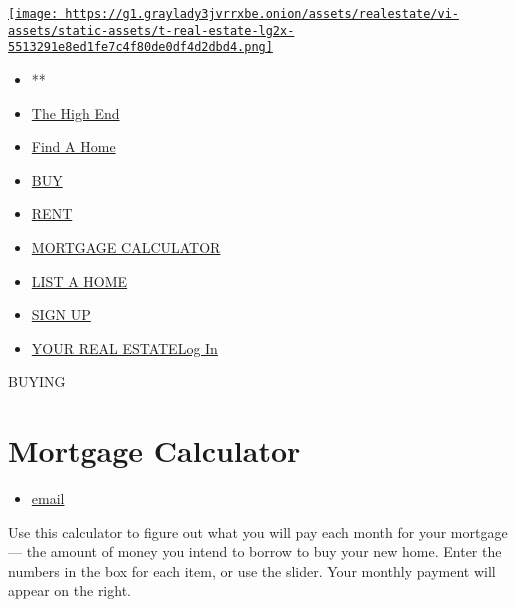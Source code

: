 \href{/section/realestate}{\texttt{[image: https://g1.graylady3jvrrxbe.onion/assets/realestate/vi-assets/static-assets/t-real-estate-lg2x-5513291e8ed1fe7c4f80de0df4d2dbd4.png]}}

\begin{itemize}
\tightlist
\item
  **
\item
  \href{/real-estate/the-high-end}{The High End}
\item
  \href{/real-estate/find-a-home}{Find A Home}
\item
  \href{/real-estate/homes-for-sale}{BUY}
\item
  \href{/real-estate/homes-for-rent}{RENT}
\item
  \href{/real-estate/mortgage-calculator}{MORTGAGE CALCULATOR}
\item
  \href{https://nytimesads.gtspayments.com}{LIST A HOME}
\item
  \href{https://myaccount.nytimes3xbfgragh.onion/auth/register?client_id=real.estate.ui\&display=control\&redirect_uri=\%2Freal-estate\%2Fmortgage-calculator\%3F\&response_type=cookie}{SIGN
  UP}
\item
  \href{https://myaccount.nytimes3xbfgragh.onion/auth/login?client_id=real.estate.ui\&display=control\&redirect_uri=\%2Freal-estate\%2Fmortgage-calculator\%3F\&response_type=cookie}{YOUR
  REAL ESTATELog In}
\end{itemize}

 BUYING

\hypertarget{mortgage-calculator}{%
\section{Mortgage Calculator}\label{mortgage-calculator}}

\begin{itemize}
\tightlist
\item
  \href{mailto:?subject=nytimes3xbfgragh.onion:\%20Mortgage\%20Calculator\%20-\%20Estimate\%20Mortgage\%20Payments\&body=From\%20The\%20New\%20York\%20Times:\%0D\%0A\%20\%0D\%0AMortgage\%20Calculator\%20-\%20Estimate\%20Mortgage\%20Payments\%0D\%0A\%20\%0D\%0ADescription\%20Here\%0D\%0A\%20\%0D\%0Ahttps://www.nytimes3xbfgragh.onion/real-estate/mortgage-calculator}{email}
\end{itemize}

Use this calculator to figure out what you will pay each month for your
mortgage --- the amount of money you intend to borrow to buy your new
home. Enter the numbers in the box for each item, or use the slider.
Your monthly payment will appear on the right.

